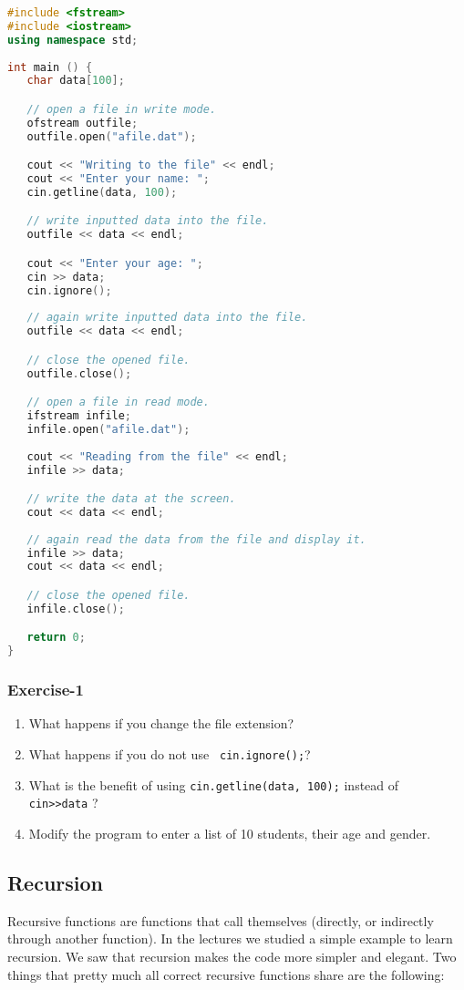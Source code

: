 \documentclass{article}
\begin{document}
\begin{lstlisting}[language=C++]
#include <fstream>
#include <iostream>
using namespace std;
 
int main () {
   char data[100];

   // open a file in write mode.
   ofstream outfile;
   outfile.open("afile.dat");

   cout << "Writing to the file" << endl;
   cout << "Enter your name: "; 
   cin.getline(data, 100);

   // write inputted data into the file.
   outfile << data << endl;

   cout << "Enter your age: "; 
   cin >> data;
   cin.ignore();
   
   // again write inputted data into the file.
   outfile << data << endl;

   // close the opened file.
   outfile.close();

   // open a file in read mode.
   ifstream infile; 
   infile.open("afile.dat"); 
 
   cout << "Reading from the file" << endl; 
   infile >> data; 

   // write the data at the screen.
   cout << data << endl;
   
   // again read the data from the file and display it.
   infile >> data; 
   cout << data << endl; 

   // close the opened file.
   infile.close();

   return 0;
}
\end{lstlisting}

\subsubsection*{Exercise-1}
\begin{enumerate}
\item What happens if you change the file extension?

\item What happens if you do not use \verb| cin.ignore();|?

\item What is the benefit of using \verb|cin.getline(data, 100);| instead of \verb| cin>>data| ?

\item Modify the program to enter a list of 10 students, their age and gender.
\end{enumerate}

\subsection*{Recursion}
Recursive functions are functions that call themselves (directly, or indirectly through another function). In the lectures we studied a simple example to learn recursion. We saw that recursion makes the code more simpler and elegant. Two things that pretty much all correct recursive functions share are the following:
\end{document}
